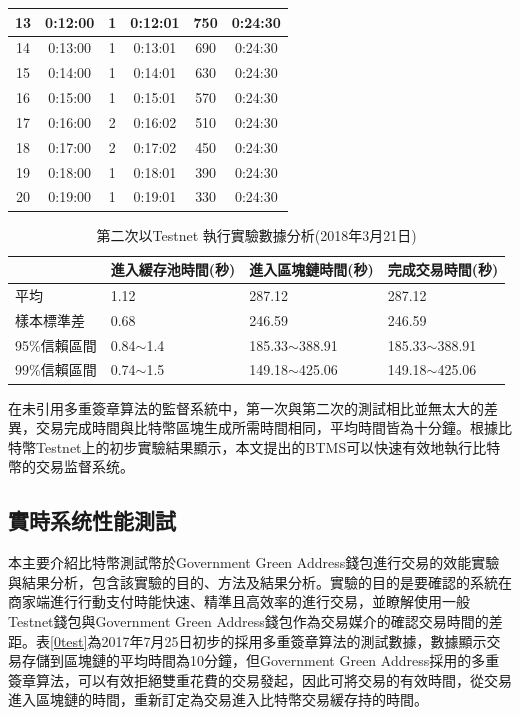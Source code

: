 \begin{enumerate}
\begin{table}[!htbp]
\begin{tabular}{|c|c|c|c|c|c|}
				13 & 0:12:00 & 1 & 0:12:01 & 750 & 0:24:30 \\ \hline
				14 & 0:13:00 & 1 & 0:13:01 & 690 & 0:24:30 \\ \hline
				15 & 0:14:00 & 1 & 0:14:01 & 630 & 0:24:30 \\ \hline
				16 & 0:15:00 & 1 & 0:15:01 & 570 & 0:24:30 \\ \hline
				17 & 0:16:00 & 2 & 0:16:02 & 510 & 0:24:30 \\ \hline
				18 & 0:17:00 & 2 & 0:17:02 & 450 & 0:24:30 \\ \hline
				19 & 0:18:00 & 1 & 0:18:01 & 390 & 0:24:30 \\ \hline
				20 & 0:19:00 & 1 & 0:19:01 & 330 & 0:24:30 \\ \hline
				\end{tabular}
				\end{table}

				\begin{table}[!htbp]
				\centering
				\caption{第二次以Testnet 執行實驗數據分析(2018年3月21日)}
				\label{2general-1}
				\begin{tabular}{|l|l|l|l|}
				\hline
				 & 進入緩存池時間(秒) & 進入區塊鏈時間(秒) & 完成交易時間(秒) \\ \hline
				平均 & 1.12 & 287.12 & 287.12 \\ \hline
				樣本標準差 & 0.68 & 246.59 & 246.59 \\ \hline
				95\%信賴區間 & 0.84$\sim$1.4 & 185.33$\sim$388.91 & 185.33$\sim$388.91 \\ \hline
				99\%信賴區間 & 0.74$\sim$1.5 & 149.18$\sim$425.06 & 149.18$\sim$425.06 \\ \hline
				\end{tabular}
				\end{table}


		\end{enumerate}

			在未引用多重簽章算法的監督系統中，第一次與第二次的測試相比並無太大的差異，交易完成時間與比特幣區塊生成所需時間相同，平均時間皆為十分鐘。根據比特幣Testnet上的初步實驗結果顯示，本文提出的BTMS可以快速有效地執行比特幣的交易监督系统。


		\subsection{實時系统性能測試}
		本主要介紹比特幣測試幣於Government Green Address錢包進行交易的效能實驗與結果分析，包含該實驗的目的、方法及結果分析。實驗的目的是要確認的系統在商家端進行行動支付時能快速、精準且高效率的進行交易，並瞭解使用一般Testnet錢包與Government Green Address錢包作為交易媒介的確認交易時間的差距。表\ref{0test}為2017年7月25日初步的採用多重簽章算法的測試數據，數據顯示交易存儲到區塊鏈的平均時間為10分鐘，但Government Green Address採用的多重簽章算法，可以有效拒絕雙重花費的交易發起，因此可將交易的有效時間，從交易進入區塊鏈的時間，重新訂定為交易進入比特幣交易緩存持的時間。

